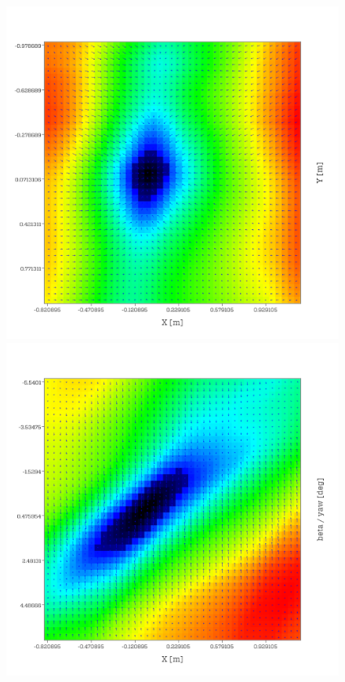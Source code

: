 \begin{figure}
\begin{minipage}[t]{0.48\textwidth}
    \end{minipage}
    \begin{minipage}[t]{0.48\textwidth}
        \includegraphics[width = \textwidth]{images/cost_surface/error_xy_1.png}
    \end{minipage}
    \hfill
    \begin{minipage}[t]{0.48\textwidth}
        \includegraphics[width = \textwidth]{images/cost_surface/error_xb_1.png}

\end{minipage}
\end{figure}
